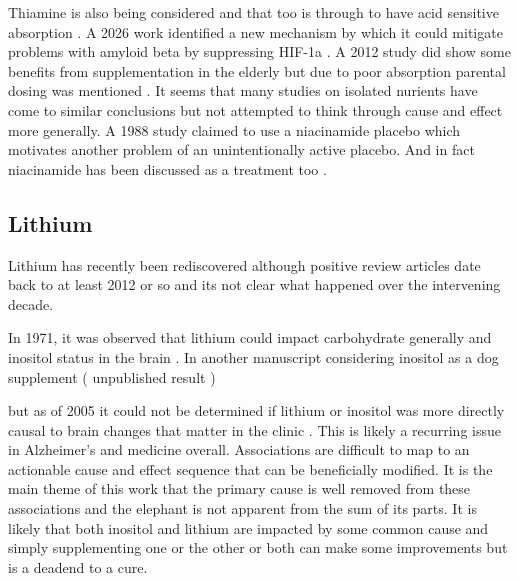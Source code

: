 
Thiamine is also being considered \cite{Fessel_Supplemental_thiamine_2021}
and that too is through to have acid sensitive absorption
\cite{PMC12811047}.
A 2026 work identified a new mechanism by which it could
mitigate problems with amyloid beta by suppressing 
HIF-1a \cite{PMID41707701}.
A 2012 study did show some benefits from supplementation in the
elderly but due to poor absorption parental dosing was
mentioned 
\cite{quUx1ed1badcharvv7889cLuong_Hoang_Role_Thiamine_2011}.
It seems that many studies on isolated nurients have come to
similar conclusions but not attempted to think through cause
and effect more generally. 
A 1988 study claimed to use a niacinamide placebo 
\cite{Blass_Thiamine_Alzheimer_1988}
which  motivates another problem of an unintentionally active
placebo.
And in fact niacinamide has been discussed as a treatment too
\cite{Klotter_Niacinamide_nicotinamide_Alzheimer_2010}. 

\subsection{Lithium }

	Lithium has recently been rediscovered 
\cite{Aron_Ngian_Qiu_Lithium_deficiency_2025}
although positive review articles date back to at least 2012
\cite{Forlenza2012} or so 
\cite{Matsunaga_Kishi_Annas_Lithium_Treatment_2015} 
and its not clear what happened over the intervening decade.

In 1971, it was observed that lithium could impact
carbohydrate generally and inositol status in the brain
\cite{ALLISON_STEWART_Reduced_Brain_Inositol_1971}.
In another manuscript considering inositol as a dog supplement
( unpublished result ) 

but as of 2005 it could not be determined if lithium or
inositol was more directly causal to brain changes
that matter in the clinic
\cite{Harwood_Lithium_bipolar_mood_2005}.
This is likely a recurring issue in Alzheimer's and medicine
overall. Associations are difficult to map to an actionable
cause and effect sequence that can be beneficially modified.
It is the main theme of this work that the primary cause
is well removed from these associations and the elephant
is not apparent from the sum of its parts. 
It is likely that both inositol and lithium are 
impacted by some common cause and simply supplementing one
or the other or both can make some improvements but is a deadend
to a cure.

